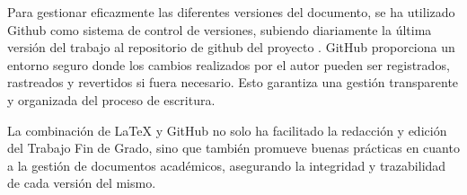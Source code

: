 Para gestionar eficazmente las diferentes versiones del documento, se ha utilizado Github como sistema de control de versiones, subiendo diariamente la última versión del trabajo al repositorio de github del proyecto \cite{vallealonsodc}. GitHub proporciona un entorno seguro donde los cambios realizados por el autor pueden ser registrados, rastreados y revertidos si fuera necesario. Esto garantiza una gestión transparente y organizada del proceso de escritura.

La combinación de LaTeX y GitHub no solo ha facilitado la redacción y edición del Trabajo Fin de Grado, sino que también promueve buenas prácticas en cuanto a la gestión de documentos académicos, asegurando la integridad y trazabilidad de cada versión del mismo.
